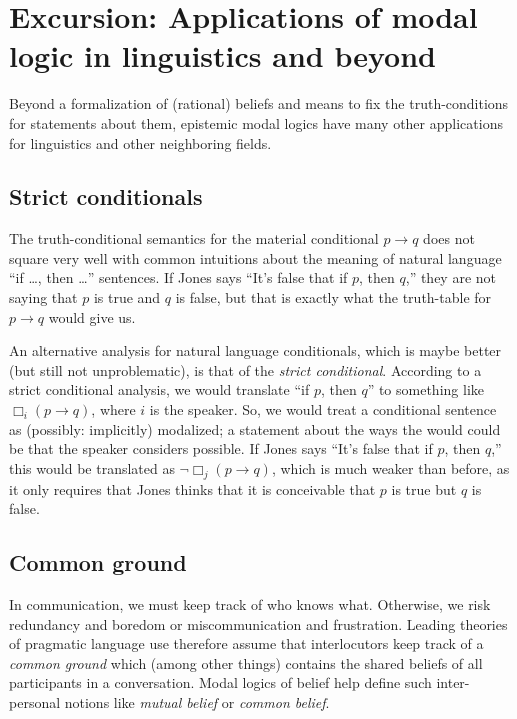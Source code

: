 \documentclass[nobib,nofonts]{tufte-handout}
\begin{document}
\section{Excursion: Applications of modal logic in linguistics and beyond}

Beyond a formalization of (rational) beliefs and means to fix the truth-conditions for statements about them, epistemic modal logics have many other applications for linguistics and other neighboring fields.

\subsection{Strict conditionals}

The truth-conditional semantics for the material conditional $p \rightarrow q$ does not square very well with common intuitions about the meaning of natural language ``if \dots, then \dots'' sentences.
If Jones says ``It's false that if $p$, then $q$,'' they are not saying that $p$ is true and $q$ is false, but that is exactly what the truth-table for $p \rightarrow q$ would give us.

An alternative analysis for natural language conditionals, which is maybe better (but still not unproblematic), is that of the \emph{strict conditional}.
According to a strict conditional analysis, we would translate ``if $p$, then $q$'' to something like $\Box_{i}(p \rightarrow q)$, where $i$ is the speaker.
So, we would treat a conditional sentence as (possibly: implicitly) modalized; a statement about the ways the would could be that the speaker considers possible.
If Jones says ``It's false that if $p$, then $q$,'' this would be translated as $\neg \Box_{j}(p \rightarrow q)$, which is much weaker than before, as it only requires that Jones thinks that it is conceivable that $p$ is true but $q$ is false.

\subsection{Common ground}

In communication, we must keep track of who knows what.
Otherwise, we risk redundancy and boredom or miscommunication and frustration.
Leading theories of pragmatic language use therefore assume that interlocutors keep track of a \emph{common ground} which (among other things) contains the shared beliefs of all participants in a conversation.
Modal logics of belief help define such inter-personal notions like \emph{mutual belief} or \emph{common belief}.
\end{document}
